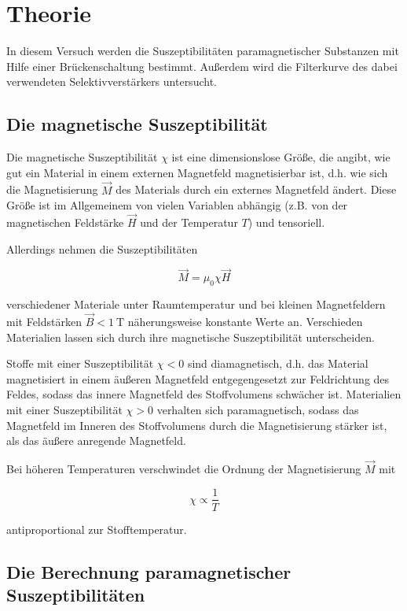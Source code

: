 \section{Theorie}
\label{sec:Theorie}

In diesem Versuch werden die Suszeptibilitäten paramagnetischer Substanzen 
mit Hilfe einer Brückenschaltung bestimmt. Außerdem wird die Filterkurve 
des dabei verwendeten Selektivverstärkers untersucht. 

\subsection{Die magnetische Suszeptibilität}

Die magnetische Suszeptibilität $\chi$ ist eine dimensionslose Größe, die 
angibt, wie gut ein Material in einem externen Magnetfeld magnetisierbar ist,
d.h. wie sich die Magnetisierung $\vec{M}$ des Materials durch ein externes Magnetfeld 
ändert. Diese Größe ist im Allgemeinem von vielen Variablen abhängig (z.B. von der
magnetischen Feldstärke $\vec{H}$ und der Temperatur $T$) und tensoriell.

Allerdings nehmen die Suszeptibilitäten 

\begin{equation}
    \vec{M} = \mu_0 \chi \vec{H}
\end{equation}

verschiedener Materiale unter Raumtemperatur und bei 
kleinen Magnetfeldern mit Feldstärken $\vec{B} < \SI{1}{\tesla}$ näherungsweise
konstante Werte an. Verschieden Materialien lassen sich durch ihre magnetische 
Suszeptibilität unterscheiden. 

Stoffe mit einer Suszeptibilität $\chi < 0$ sind diamagnetisch, d.h. das Material 
magnetisiert in einem äußeren Magnetfeld entgegengesetzt zur Feldrichtung des Feldes,
sodass das innere Magnetfeld des Stoffvolumens schwächer ist.
Materialien mit einer Suszeptibilität $\chi > 0$ verhalten sich paramagnetisch, sodass
das Magnetfeld im Inneren des Stoffvolumens durch die Magnetisierung stärker ist, als 
das äußere anregende Magnetfeld.

Bei höheren Temperaturen verschwindet die Ordnung der Magnetisierung $\vec{M}$ mit

\begin{equation}
    \chi \propto \frac{1}{T}
\end{equation}

antiproportional zur Stofftemperatur.

\subsection{Die Berechnung paramagnetischer Suszeptibilitäten}

